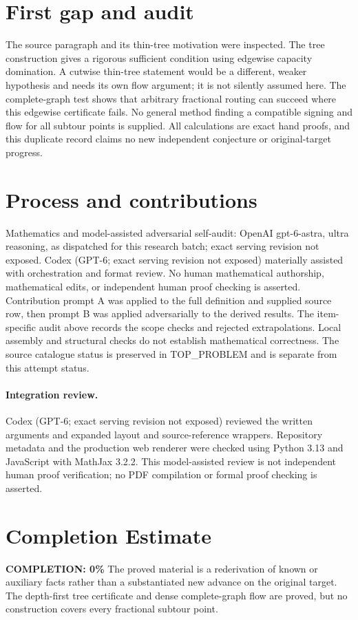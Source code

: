 \documentclass[11pt]{article}
\begin{document}
\section{First gap and audit}
The source paragraph and its thin-tree motivation were inspected.
The tree construction gives a rigorous sufficient condition using
edgewise capacity domination. A cutwise thin-tree statement would
be a different, weaker hypothesis and needs its own flow argument;
it is not silently assumed here. The complete-graph test shows
that arbitrary fractional routing can succeed where this edgewise
certificate fails. No general method finding a compatible signing
and flow for all subtour points is supplied. All calculations
are exact hand proofs, and this duplicate record claims no new
independent conjecture or original-target progress.

\section{Process and contributions}
Mathematics and model-assisted adversarial self-audit: OpenAI gpt-6-astra, ultra reasoning, as dispatched for this research batch; exact serving revision not exposed. Codex (GPT-6; exact serving revision not exposed) materially assisted with orchestration and format review. No human mathematical authorship, mathematical edits, or independent human proof checking is asserted.
Contribution prompt A was applied to the full definition and supplied source row, then prompt B was applied adversarially to the derived results. The item-specific audit above records the scope checks and rejected extrapolations. Local assembly and structural checks do not establish mathematical correctness. The source catalogue status is preserved in TOP\_PROBLEM and is separate from this attempt status.
\paragraph{Integration review.} Codex (GPT-6; exact serving revision not exposed) reviewed the written arguments and expanded layout and source-reference wrappers. Repository metadata and the production web renderer were checked using Python 3.13 and JavaScript with MathJax 3.2.2. This model-assisted review is not independent human proof verification; no PDF compilation or formal proof checking is asserted.

\section{Completion Estimate}
\noindent\textbf{COMPLETION: 0\%}
The proved material is a rederivation of known or auxiliary facts rather than a substantiated new advance on the original target. The depth-first tree certificate and dense complete-graph flow are proved, but no construction covers every fractional subtour point.
\end{document}
